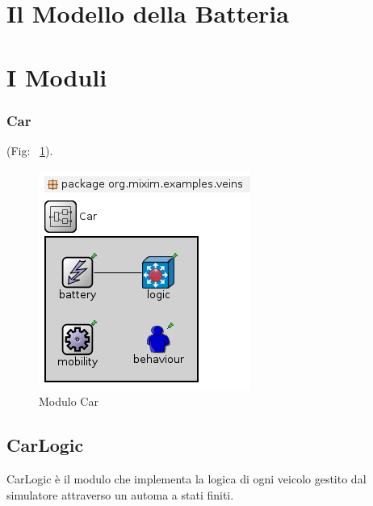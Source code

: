 
\section{Il Modello della Batteria}\label{sec:battery}

\section{I Moduli}

\subsubsection{Car}

(Fig: ~\ref{fig:module-car}).

\begin{figure}[H]
\centering
\includegraphics[scale=0.5]{assets/module-car.png}
\caption{Modulo Car}
\label{fig:module-car}
\end{figure}


\subsection{CarLogic}

CarLogic è il modulo che implementa la logica di ogni veicolo gestito dal simulatore attraverso un automa a stati finiti. 


